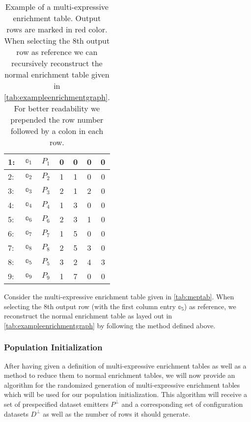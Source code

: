 \begin{table}[tb]
\caption[Example of a multi-expressive enrichment table]{Example of a multi-expressive enrichment table. Output rows are marked in red color. When selecting the 8th output row as reference we can recursively reconstruct the normal enrichment table given in  \autoref{tab:exampleenrichmentgraph}. For better readability we prepended the row number followed by a colon in each row.}
\centering
\begin{tabular}{lc|c|c|c|c|c}
  1: & $\mathbb{o}_1$ & $P_1$ & 0 & 0 & 0 & 0\\ \hline
  2: & $\mathbb{o}_2$ & $P_2$ & 1 & 1 & 0 & 0\\ \hline
  3: & $\mathbb{o}_3$ & $P_3$ & 2 & 1 & 2 & 0\\ \hline
  4: & $\mathbb{o}_4$ & $P_4$ & 1 & 3 & 0 & 0\\ \hline
  5: & $\mathbb{o}_6$ & $P_6$ & 2 & 3 & 1 & 0\\ \hline
  \rowcolor{Maroon!50}
  6: & $\mathbb{o}_7$ & $P_7$ & 1 & 5 & 0 & 0\\ \hline
  7: & $\mathbb{o}_8$ & $P_8$ & 2 & 5 & 3 & 0\\ \hline
  \rowcolor{Maroon!50}
  8: & $\mathbb{o}_5$ & $P_5$ & 3 & 2 & 4 & 3\\ \hline
  \rowcolor{Maroon!50}
  9: & $\mathbb{o}_9$ & $P_9$ & 1 & 7 & 0 & 0
\end{tabular}
\label{tab:meptab}
\end{table}


Consider the multi-expressive enrichment table given in \autoref{tab:meptab}.
When selecting the 8th output row (with the first column entry $\mathbb{o}_5$) as reference, we reconstruct the normal enrichment table as layed out in \autoref{tab:exampleenrichmentgraph} by following the method defined above.

\subsubsection{Population Initialization}

After having given a definition of multi-expressive enrichment tables as well as a method to reduce them to normal enrichment tables, we will now provide an algorithm for the randomized generation of multi-expressive enrichment tables which will be used for our population initialization.
This algorithm will receive a set of prespecified dataset emitters $P^\bot$ and a corresponding set of configuration datasets $D^\bot$ as well as the number of rows it should generate.\\

